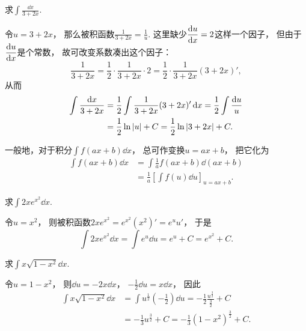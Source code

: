 \begin{example}
求\(\int \frac{\dd{x}}{3+2x}\).
\begin{solution}
令\(u = 3+2x\)，
那么被积函数\(\frac{1}{3+2x} = \frac{1}{u}\).
这里缺少\(\displaystyle\dv{u}{x}=2\)这样一个因子，
但由于\(\displaystyle\dv{u}{x}\)是个常数，
故可改变系数凑出这个因子：\[
	\frac{1}{3+2x}
	= \frac{1}{2} \cdot \frac{1}{3+2x} \cdot 2
	= \frac{1}{2} \cdot \frac{1}{3+2x} (3+2x)',
\]
从而\begin{align*}
	\int \frac{\dd{x}}{3+2x}
	&= \frac{1}{2} \int \frac{1}{3+2x} (3+2x)' \dd{x}
	= \frac{1}{2} \int \frac{\dd{u}}{u} \\
	&= \frac{1}{2} \ln\abs{u} + C
	= \frac{1}{2} \ln\abs{3+2x} + C.
\end{align*}
\end{solution}
\end{example}

\begin{remark}
一般地，对于积分\(\int f(ax+b) \dd{x}\)，
总可作变换\(u=ax+b\)，
把它化为\begin{align*}
	\int f(ax+b) \dd{x}
	&= \int \frac{1}{a} f(ax+b) \dd(ax+b) \\
	&= \frac{1}{a} \left[ \int f(u) \dd{u} \right]_{u=ax+b}.
\end{align*}
\end{remark}

\begin{example}
求\(\int 2x e^{x^2} \dd{x}\).
\begin{solution}
令\(u=x^2\)，
则被积函数\(2x e^{x^2} = e^{x^2} (x^2)' = e^u u'\)，
于是\[
	\int 2x e^{x^2} \dd{x}
	= \int e^u \dd{u}
	= e^u + C
	= e^{x^2} + C.
\]
\end{solution}
\end{example}

\begin{example}
求\(\int x \sqrt{1-x^2} \dd{x}\).
\begin{solution}
令\(u=1-x^2\)，
则\(\dd{u} = -2x\dd{x}\)，
\(-\frac{1}{2}\dd{u} = x\dd{x}\)，
因此\begin{align*}
	\int x \sqrt{1-x^2} \dd{x}
	&= \int u^{\frac{1}{2}} \left(-\frac{1}{2}\right) \dd{u}
	= -\frac{1}{2} \frac{u^{\frac{3}{2}}}{\frac{3}{2}} + C \\
	&= -\frac{1}{3} u^{\frac{3}{2}} + C
	= -\frac{1}{3} (1-x^2)^{\frac{3}{2}} + C.
\end{align*}
\end{solution}
\end{example}

